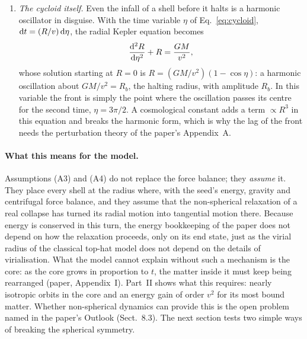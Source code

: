 \documentclass[11pt,a4paper]{article}
\begin{document}
\begin{enumerate}
  $\kappa=2\Omega$ and the orbits close. For the example galaxy
  $\omega=28.4\,{\rm km\,s^{-1}\,kpc^{-1}}$ and $2\pi/\omega=216$\,Myr. A particle on
  a radial orbit through the core simply oscillates through the centre with this
  period.
\item \emph{The cycloid itself.} Even the infall of a shell before it halts is a
  harmonic oscillator in disguise. With the time variable $\eta$ of
  Eq.~\eqref{eq:cycloid}, ${\rm d}t=(R/v)\,{\rm d}\eta$, the radial Kepler equation
  becomes
  \begin{equation}
    \frac{{\rm d}^2R}{{\rm d}\eta^2}+R=\frac{GM}{v^2},
  \end{equation}
  whose solution starting at $R=0$ is $R=(GM/v^2)(1-\cos\eta)$: a harmonic oscillation
  about $GM/v^2=R_b$, the halting radius, with amplitude $R_b$. In this variable the
  front is simply the point where the oscillation passes its centre for the second
  time, $\eta=3\pi/2$. A cosmological constant adds a term $\propto R^3$ in this
  equation and breaks the harmonic form, which is why the lag of the front needs the
  perturbation theory of the paper's Appendix~A.
\end{enumerate}

\paragraph{What this means for the model.} Assumptions (A3) and (A4) do not replace
the force balance; they \emph{assume} it. They place every shell at the radius where,
with the seed's energy, gravity and centrifugal force balance, and they assume that
the non-spherical relaxation of a real collapse has turned its radial motion into
tangential motion there. Because energy is conserved in this turn, the energy
bookkeeping of the paper does not depend on how the relaxation proceeds, only on its
end state, just as the virial radius of the classical top-hat model does not depend
on the details of virialisation. What the model cannot explain without such a
mechanism is the core: as the core grows in proportion to $t$, the matter inside it
must keep being rearranged (paper, Appendix~I). Part~II shows what this requires:
nearly isotropic orbits in the core and an energy gain of order $v^2$ for its most
bound matter. Whether non-spherical dynamics can provide this is the open problem
named in the paper's Outlook (Sect.~8.3). The next section tests two simple ways of
breaking the spherical symmetry.
\end{document}
